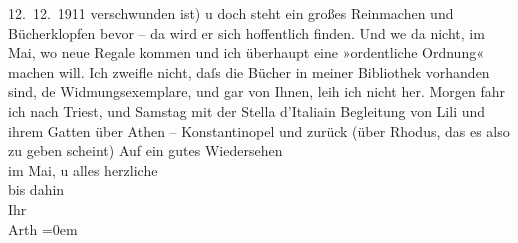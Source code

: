 \begin{ledgroupsized}[t]{13cm}
{{{               12. 12. 1911}}}\label{K_L03024-23h} verschwunden ist) u doch steht ein großes Reinmachen und Bücherklopfen bevor
               – da wird er sich hoffentlich finden. Und we{\geminationn} da nicht,
               im Mai, wo neue Regale kommen und ich überhaupt eine »ordentliche Ordnung« machen
               will. Ich zweifle nicht, daſs die Bücher in meiner Bibliothek vorhanden sind, de{\geminationn}
               Widmungsexemplare, und gar von Ihnen, leih ich nicht her. \pend
           \pstart
           Morgen fahr ich nach Triest, und
                  Samstag mit der Stella d’Italiain Begleitung von Lili und ihrem Gatten über Athen – Konstantinopel und zurück (über Rhodus, das es also zu geben scheint) \pend
           \pstart
           Auf ein gutes Wiedersehen {\\[\baselineskip]}im Mai, u alles herzliche {\\[\baselineskip]}bis
               dahin {\\[\baselineskip]}Ihr {\\[\baselineskip]}\spacefill\mbox{Arth}\pend
           \leftskip=0em{}
         
         \endnumbering{}\end{ledgroupsized}\begin{anhang}\end{anhang}\newcommand{\dateiname}{L03024}\newcommand{\titel}{Arthur Schnitzler an Felix Salten, 11. 4. 1928}\newcommand{\editorInnen}{Martin Anton Müller und Laura Untner}
      
